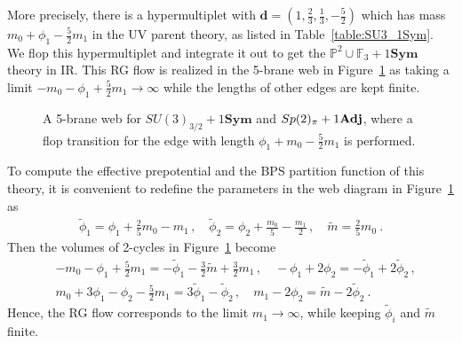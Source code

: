 More precisely, there is a hypermultiplet with $ \mathbf{d} = (1, \frac{2}{3}, \frac{1}{3}, -\frac{5}{2}) $ which has mass $ m_0 + \phi_1 - \frac{5}{2}m_1 $ in the UV parent theory, as listed in Table~\ref{table:SU3_1Sym}. We flop this hypermultiplet and integrate it out to get the $ \mathbb{P}^2 \cup \mathbb{F}_3 + 1\mathbf{Sym} $ theory in IR. This RG flow is realized in the 5-brane web in Figure~\ref{fig:P2-F3-Sym} as taking a limit $ -m_0 - \phi_1 + \frac{5}{2}m_1 \to \infty $ while the lengths of other edges are kept finite.
\begin{figure}
	\centering
	\caption{A 5-brane web for $ SU(3)_{3/2} + 1\mathbf{Sym} $ and $Sp(2)_\pi + 1{\bf Adj}$, where a flop transition for the edge with length $\phi_1+m_0-\frac{5}{2}m_1$ is performed.} \label{fig:P2-F3-Sym}
\end{figure}

To compute the effective prepotential and the BPS partition function of this theory, it is convenient to redefine the parameters in the web diagram in Figure~\ref{fig:P2-F3-Sym} as
\begin{align}\label{eq:P2-F3_var_redef}
\tilde{\phi}_1 = \phi_1 + \frac{2}{5}m_0 - m_1 \, , \quad
\tilde{\phi}_2 = \phi_2 + \frac{m_0}{5} - \frac{m_1}{2} \, , \quad
\tilde{m} = \frac{2}{5} m_0 \ .
\end{align}
Then the volumes of 2-cycles in Figure~\ref{fig:P2-F3-Sym} become
\begin{align}
&-m_0 -\phi_1 + \frac{5}{2}m_1 = -\tilde{\phi}_1 - \frac{3}{2}\tilde{m} + \frac{3}{2}m_1 \, , \quad -\phi_1 + 2\phi_2 = -\tilde{\phi}_1 + 2\tilde{\phi}_2 \,,  \nonumber \\
&m_0 + 3\phi_1 - \phi_2 - \frac{5}{2}m_1 = 3\tilde{\phi}_1 - \tilde{\phi}_2 \, , \quad m_1 - 2\phi_2 = \tilde{m} - 2\tilde{\phi}_2 \ . 
\end{align}
Hence, the RG flow corresponds to the limit $ m_1 \to \infty $,  while keeping $ \tilde{\phi}_i $ and $ \tilde{m} $ finite.

